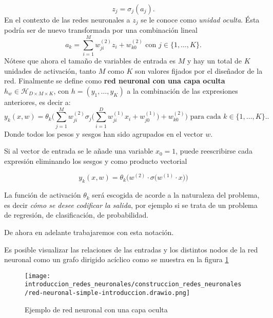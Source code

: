 \begin{equation}
    z_j = \sigma_j(a_j).
\end{equation}
En el contexto de las redes neuronales a $z_j$ se le conoce como \textit{unidad oculta}. Ésta  podría ser de 
nuevo  transformada por una combinación lineal 
\begin{equation}
    a_k = \sum_{i=1}^M w_{ji}^{(2)} z_i + w_{k0}^{(2)}
    \text{ con } j \in \{1, \ldots, K \}.
\end{equation}
Nótese que ahora el tamaño de variables de entrada es $M$
y hay un total de $K$ unidades de activación, tanto $M$ como $K$ son
valores fijados por el diseñador de la red. 
Finalmente se define como \textbf{red neuronal con una capa oculta} $h_w \in \mathcal{H}_{D \times M \times K}$, con $h=(y_1, \ldots, y_K)$ a la combinación de las expresiones anteriores, es decir a: 
\begin{equation}
    y_k(x,w) = \theta_k 
    \biggl( 
        \sum^M_{j=1} w_{ji}^{(2)}
        \sigma_j 
        \biggl(
            \sum_{i=1}^D w_{ji}^{(1)} x_i + w_{j0}^{(1)}
        \biggr)
        + w_{k0}^{(2)}
    \biggr) 
    \text{ para cada  } k \in \{1, \ldots, K \}..
\end{equation}
Donde todos los pesos y sesgos han sido agrupados en el vector $w$. 

Si al vector de entrada se le añade una variable $x_0 = 1$, puede reescribirse cada expresión eliminando los sesgos y como producto vectorial

\begin{equation}
    y_k(x,w) = \theta_k 
    \bigl(
         w^{(2)} \cdot
        \sigma    
        \bigl(
             w^{(1)} \cdot x 
        \bigr)
    \bigr)
\end{equation}  

La función de activación $\theta_k$ será escogida de acorde a la
naturaleza del problema, es decir \textit{cómo se desee codificar la salida}, por ejemplo si se trata de un problema de regresión, de clasificación, de probabilidad. 
 
De ahora en adelante trabajaremos con esta notación. 

Es posible visualizar las relaciones de las entradas y los distintos nodos de la 
red neuronal como un grafo dirigido acíclico como se muestra en la figura \ref{img:ejemplo topología red neuronal}

\begin{figure}[h!] 
    \centering
    \texttt{[image: introduccion\_redes\_neuronales/construccion\_redes\_neuronales/red-neuronal-simple-introduccion.drawio.png]}
    \caption{Ejemplo de red neuronal con una capa oculta}
    \label{img:ejemplo topología red neuronal}
\end{figure} 
 


